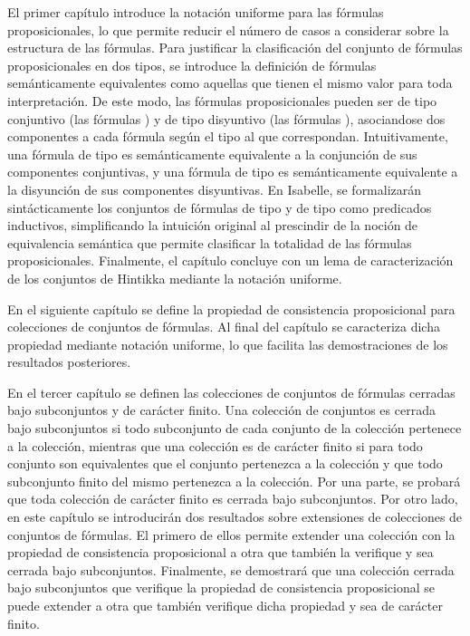 \begin{isabellebody}
\begin{isamarkuptext}
  El primer capítulo introduce la notación uniforme para las fórmulas
  proposicionales, lo que permite reducir el número de casos a considerar 
  sobre la estructura de las fórmulas. Para justificar la clasificación del 
  conjunto de fórmulas proposicionales en dos tipos, se introduce la definición de 
  fórmulas semánticamente equivalentes como aquellas que tienen el mismo valor 
  para toda interpretación. De este modo, las fórmulas proposicionales pueden ser 
  de tipo conjuntivo (las fórmulas \isa{{\isasymalpha}}) y de tipo disyuntivo (las fórmulas \isa{{\isasymbeta}}),
  asociandose dos componentes a cada fórmula según el tipo al que correspondan. 
  Intuitivamente, una fórmula de tipo \isa{{\isasymalpha}} es semánticamente equivalente a la 
  conjunción de sus componentes conjuntivas, y una fórmula de tipo \isa{{\isasymbeta}} es 
  semánticamente equivalente a la disyunción de sus componentes disyuntivas. En 
  Isabelle, se formalizarán sintácticamente los conjuntos de fórmulas de tipo \isa{{\isasymalpha}} 
  y de tipo \isa{{\isasymbeta}} como predicados inductivos, simplificando la intuición original al 
  prescindir de la noción de equivalencia semántica que permite clasificar la 
  totalidad de las fórmulas proposicionales. Finalmente, el capítulo concluye con 
  un lema de caracterización de los conjuntos de Hintikka mediante la notación 
  uniforme.

  En el siguiente capítulo se define la propiedad de consistencia proposicional
  para colecciones de conjuntos de fórmulas. Al final del capítulo se caracteriza 
  dicha propiedad mediante notación uniforme, lo que facilita las demostraciones 
  de los resultados posteriores.

  En el tercer capítulo se definen las colecciones de conjuntos de fórmulas
  cerradas bajo subconjuntos y de carácter finito. Una colección de conjuntos 
  es cerrada bajo subconjuntos si todo subconjunto de cada conjunto de la 
  colección pertenece a la colección, mientras que una colección es de 
  carácter finito si para todo conjunto son equivalentes que el conjunto
  pertenezca a la colección y que todo subconjunto finito del mismo pertenezca
  a la colección. Por una parte, se probará que toda colección de carácter 
  finito es cerrada bajo subconjuntos. Por otro lado, en este capítulo se
  introducirán dos resultados sobre extensiones de colecciones de conjuntos de
  fórmulas. El primero de ellos permite extender una colección con la propiedad de 
  consistencia proposicional a otra que también la verifique y sea cerrada bajo 
  subconjuntos. Finalmente, se demostrará que una colección cerrada bajo 
  subconjuntos que verifique la propiedad de consistencia proposicional se puede 
  extender a otra que también verifique dicha propiedad y sea de carácter finito. 


\end{isamarkuptext}
\end{isabellebody}
